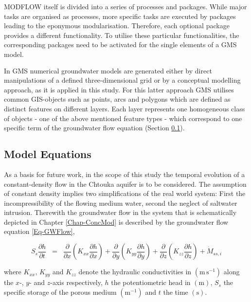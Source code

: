MODFLOW itself is divided into a series of processes and packages. 
While major tasks are organised as processes, more specific tasks are executed by packages leading to the eponymous modularisation. 
Therefore, each optional package provides a different functionality. 
To utilise these particular functionalities, the corresponding packages need to be activated for the single elements of a GMS model.

In GMS numerical groundwater models are generated either by direct manipulations of a defined three-dimensional grid or by a conceptual modelling approach, as it is applied in this study. 
For this latter approach GMS utilises common GIS-objects such as points, arcs and polygons which are defined as distinct features on different layers. 
Each layer represents one homogeneous class of objects - one of the above mentioned feature types - which correspond to one specific term of the groundwater flow equation (Section \ref{Sec-ModEq}).


\subsection{Model Equations}
\label{Sec-ModEq}

As a basis for future work, in the scope of this study the temporal evolution of a constant-density flow in the Chtouka aquifer is to be considered. 
The assumption of constant density implies two simplifications of the real world system: First the incompressibility of the flowing medium water, second the neglect of saltwater intrusion. 
Therewith the groundwater flow in the system that is schematically depicted in Chapter \ref{Chap-ConcMod} is described by the groundwater flow equation \eqref{Eq-GWFlow},

\begin{equation}
    S_s \frac{\partial h}{\partial t} \; \; = \; \; \frac{\partial}{\partial x} \left(K_{xx} \frac{\partial h}{\partial x} \right) + \frac{\partial}{\partial y} \left(K_{yy} \frac{\partial h}{\partial y} \right) + \frac{\partial}{\partial z} \left(K_{zz} \frac{\partial h}{\partial z} \right) + \dot{M}_{ss,i}
\end{equation}

where $K_{xx}$, $K_{yy}$ and $K_{zz}$ denote the hydraulic conductivities in $\left( \textrm{m} \, \textrm{s}^{-1} \right)$ along the $x$-, $y$- and $z$-axis respectively, $h$ the potentiometric head in $\left( \textrm{m} \right)$, $S_s$ the specific storage of the porous medium $\left( \textrm{m}^{-1} \right)$ and $t$ the time $\left( \textrm{s} \right)$.

